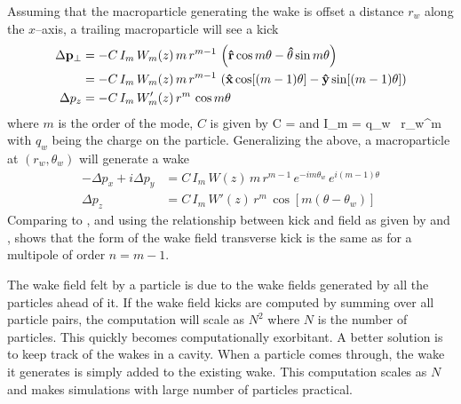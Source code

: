 Assuming that the macroparticle generating the wake is offset a
distance $r_w$ along the $x$--axis, a trailing macroparticle will see a kick
\begin{align}
  \Delta {{\bf p}}_\perp &= 
    -C \, I_m \, W_m(z) \, m \, r^{m-1} \, \left( 
    {\bf\hat r} \cos m\theta - {\bf\hat\theta} \sin m\theta \right) \\
  &= -C \, I_m \, W_m(z) \, m \, r^{m-1} \, \left( 
    {\bf\hat x} \cos [(m-1) \theta] - 
    {\bf\hat y} \sin [(m-1)\theta] \right) \nonumber \\
  \Delta p_z &= -C \, I_m \, W'_m(z) \, r^m \, \cos m\theta
\end{align}
where $m$ is the order of the mode, $C$ is given by
\Begineq
  C = 
\Endeq
 and
\Begineq
  I_m = q_w \, r_w^m
\Endeq
with $q_w$ being the charge on the particle. Generalizing the above, a
macroparticle at $(r_w, \theta_w)$ will generate a wake
\begin{align}
  -\Delta p_x + i\Delta p_y &= C \, I_m \, W(z) \, 
    m \, r^{m-1} \, e^{-i m \theta_w} \, e^{i (m-1) \theta} 
    \label{ppcimr} \\
  \Delta p_z &= C \, I_m \, W'(z) \, r^m \, \cos [m(\theta - \theta_w)]
    \label{pciwr}
\end{align}
Comparing  to , and using the relationship between
kick and field as given by  and , shows that
the form of the wake field transverse kick is the same as for a
multipole of order $n = m - 1$. 

The wake field felt by a particle is due to the wake fields generated by
all the particles ahead of it. If the wake field kicks are computed by
summing over all particle pairs, the
computation will scale as $N^2$ where $N$ is the number of
particles. This quickly becomes computationally exorbitant. A better
solution is to keep track of the wakes in a cavity. When a particle
comes through, the wake it generates is simply added to the existing
wake. This computation scales as $N$ and makes simulations with large
number of particles practical. 

